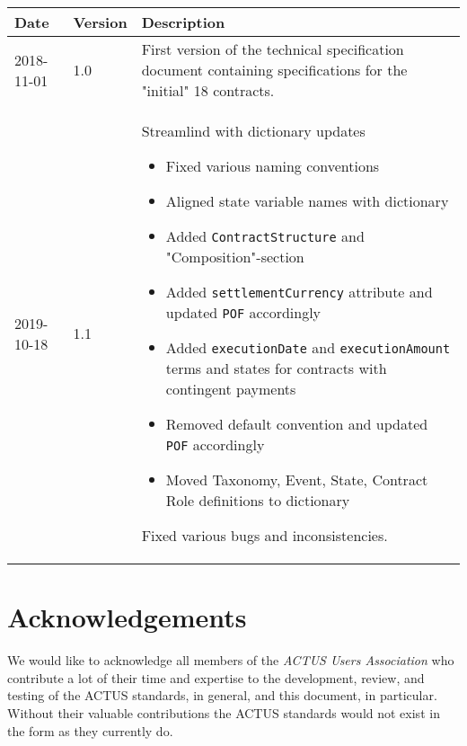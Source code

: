 \documentclass[9pt,oneside]{amsart}
\newcommand{\attr}[1]{\texttt{#1}}
\begin{document}
\begin{table}[H]
  \centering
  \begin{tabular}{| p{} | p{} | p{} |}
  \hline
  Date & Version & Description \\
  \hline
  2018-11-01 & 1.0 & First version of the technical specification document containing specifications for the "initial" 18 contracts.\\
  \hline
  2019-10-18 & 1.1 & Streamlind with dictionary updates
	\begin{itemize}
		\item Fixed various naming conventions
		\item Aligned state variable names with dictionary
		\item Added \attr{ContractStructure} and "Composition"-section
		\item Added \attr{settlementCurrency} attribute and updated \attr{POF} accordingly
		\item Added \attr{executionDate} and \attr{executionAmount} terms and states for contracts with contingent payments
		\item Removed default convention and updated \attr{POF} accordingly
		\item Moved Taxonomy, Event, State, Contract Role definitions to dictionary
	\end{itemize} \par
		Fixed various bugs and inconsistencies. \\
  \hline
  \end{tabular}
\end{table}


\section*{Acknowledgements}\label{sec:ack}

We would like to acknowledge all members of the \textit{ACTUS Users Association} who contribute a lot of their time and expertise to the development, review, and testing of the ACTUS standards, in general, and this document, in particular. Without their valuable contributions the ACTUS standards would not exist in the form as they currently do.



\newpage
\tableofcontents
\end{document}
